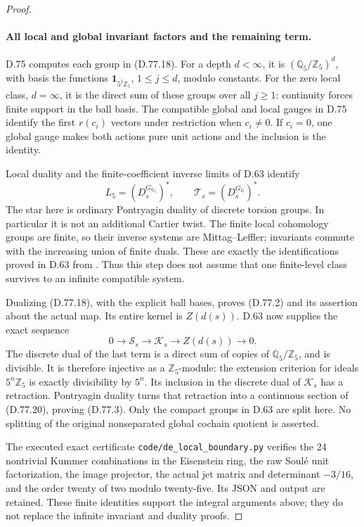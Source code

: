 \begin{proof}
\paragraph{All local and global invariant factors and the remaining term.}
D.75 computes each group in (D.77.18). For a depth \(d<\infty\),
it is \((\mathbb Q_5/\mathbb Z_5)^d\), with basis the functions
\(\mathbf1_{5^j\mathbb Z_5}\), \(1\le j\le d\), modulo constants.
For the zero local class, \(d=\infty\), it is the direct sum of
these groups over all \(j\ge1\): continuity forces finite support
in the ball basis. The compatible global and local gauges in
D.75 identify the first \(r(c_i)\) vectors under restriction
when \(c_i\ne0\). If \(c_i=0\), one global gauge makes both
actions pure unit actions and the inclusion is the identity.

Local duality and the finite-coefficient inverse limits of D.63
identify
\[
 L_5=(D_s^{G_{\mathbb Q_5}})^*,\qquad
 \mathcal T_s=(D_s^{G_{\mathbb Q}})^*.
                                                               \tag{D.77.19}
\]
The star here is ordinary Pontryagin duality of discrete torsion
groups. In particular it is not an additional Cartier twist.
The finite local cohomology groups are finite, so their inverse
systems are Mittag--Leffler; invariants commute with the increasing
union of finite duals. These are exactly the identifications
proved in D.63 from \cite[I.2.1, I.2.3, I.4.10]{DE_MilneADT}.
Thus this step does not assume that one finite-level class
survives to an infinite compatible system.

Dualizing (D.77.18), with the explicit ball bases, proves
(D.77.2) and its assertion about the actual map. Its entire
kernel is \(Z(d(s))\). D.63 now supplies the exact sequence
\[
 0\longrightarrow\mathcal S_s\longrightarrow\mathcal K_s
       \longrightarrow Z(d(s))\longrightarrow0.
                                                               \tag{D.77.20}
\]
The discrete dual of the last term is a direct sum of copies of
\(\mathbb Q_5/\mathbb Z_5\), and is divisible. It is therefore
injective as a \(\mathbb Z_5\)-module: the extension criterion
for ideals \(5^n\mathbb Z_5\) is exactly divisibility by \(5^n\).
Its inclusion in the discrete dual of \(\mathcal K_s\) has a
retraction. Pontryagin duality turns that retraction into a
continuous section of (D.77.20), proving (D.77.3).
Only the compact groups in D.63 are split here. No splitting
of the original nonseparated global cochain quotient is asserted.

The executed exact certificate
\texttt{code/de\_local\_boundary.py} verifies the 24
nontrivial Kummer combinations in the Eisenstein ring, the raw
Soul\'e unit factorization, the image projector, the actual jet
matrix and determinant \(-3/16\), and the order twenty of two
modulo twenty-five. Its JSON and output are retained. These finite
identities support the integral arguments above; they do not
replace the infinite invariant and duality proofs.
\end{proof}
